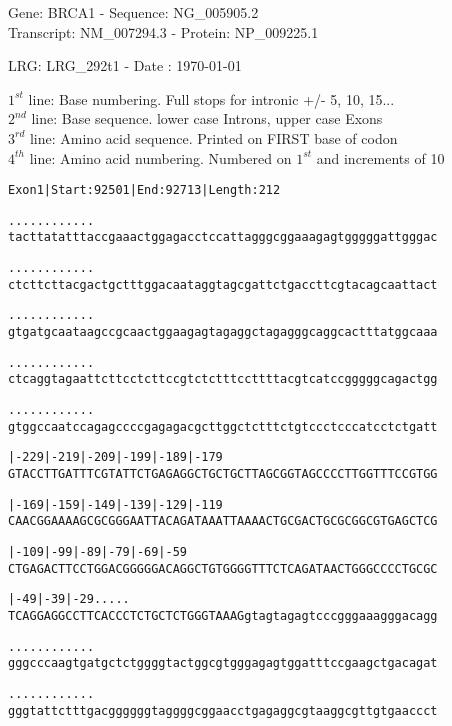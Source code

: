 \documentclass{article}
\begin{document}
\begin{center}
\begin{large}
Gene: BRCA1 - Sequence: NG\_005905.2\\
Transcript: NM\_007294.3 - Protein: NP\_009225.1
 
LRG: LRG\_292t1 - Date : \today
{}
\end{large}
\end{center}
$1^{st}$ line: Base numbering. Full stops for intronic +/- 5, 10, 15...\\
$2^{nd}$ line: Base sequence. lower case Introns, upper case Exons\\
$3^{rd}$ line: Amino acid sequence. Printed on FIRST base of codon\\
$4^{th}$ line: Amino acid numbering. Numbered on $1^{st}$ and increments of 10\\
\begin{alltt}
Exon 1 | Start: 92501 | End: 92713 | Length: 212

.    .    .    .    .    .    .    .    .    .    .    .    
tacttatatttaccgaaactggagacctccattagggcggaaagagtgggggattgggac

.    .    .    .    .    .    .    .    .    .    .    .    
ctcttcttacgactgctttggacaataggtagcgattctgaccttcgtacagcaattact

.    .    .    .    .    .    .    .    .    .    .    .    
gtgatgcaataagccgcaactggaagagtagaggctagagggcaggcactttatggcaaa

.    .    .    .    .    .    .    .    .    .    .    .    
ctcaggtagaattcttcctcttccgtctctttccttttacgtcatccgggggcagactgg

.    .    .    .    .    .    .    .    .    .    .    .    
gtggccaatccagagccccgagagacgcttggctctttctgtccctcccatcctctgatt

   |-229     |-219     |-209     |-199     |-189     |-179  
GTACCTTGATTTCGTATTCTGAGAGGCTGCTGCTTAGCGGTAGCCCCTTGGTTTCCGTGG

   |-169     |-159     |-149     |-139     |-129     |-119  
CAACGGAAAAGCGCGGGAATTACAGATAAATTAAAACTGCGACTGCGCGGCGTGAGCTCG

   |-109     |-99      |-89      |-79      |-69      |-59   
CTGAGACTTCCTGGACGGGGGACAGGCTGTGGGGTTTCTCAGATAACTGGGCCCCTGCGC

   |-49      |-39      |-29          .    .    .    .    .  
TCAGGAGGCCTTCACCCTCTGCTCTGGGTAAAGgtagtagagtcccgggaaagggacagg

  .    .    .    .    .    .    .    .    .    .    .    .  
gggcccaagtgatgctctggggtactggcgtgggagagtggatttccgaagctgacagat

  .    .    .    .    .    .    .    .    .    .    .    .  
gggtattctttgacggggggtaggggcggaacctgagaggcgtaaggcgttgtgaaccct

\end{alltt}
\end{document}
